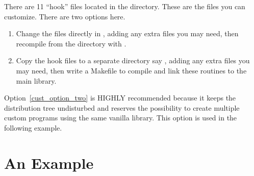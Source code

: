 There are 11 ``hook'' files located in the  directory. These are
the files you can customize. There are two options here. 
\begin{enumerate}
  \item Change the files directly in , adding any extra
    files you may need, then recompile from the  directory with
  .  \label{cust_option_one}
  \item Copy the hook files to a separate directory say ,
    adding any extra files you may need, then write a Makefile to compile and link these
    routines to the main \tao library. \label{cust_option_two}
\end{enumerate}
Option~\ref{cust_option_two} is HIGHLY recommended because it keeps the \tao
distribution tree undisturbed and reserves the possibility to create multiple
custom \tao programs using the same vanilla \tao library. This option is used in
the following example.

\section{An Example}

